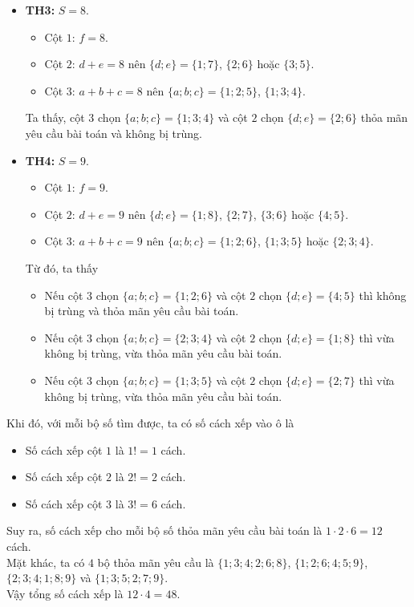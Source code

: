 \begin{ex}
{\begin{itemize}
			\begin{itemize}
				\item Cột $1$: $f=7$.
				\item Cột $2$: $d+e=7$ nên $\{d;e\}=\{1;6\}$, $\{2;5\}$ hoặc $\{3;4\}$.
				\item Cột $3$: $a+b+c=7$ nên $\{a;b;c\}=\{1;2;4\}$.
			\end{itemize}
			Vì cột $3$ và cột $2$ bị trùng các số $1$, $2$ và $4$ nên trường hợp này không xảy ra.
			\item \textbf{TH3:} $S=8$.
			\begin{itemize}
				\item Cột $1$: $f=8$.
				\item Cột $2$: $d+e=8$ nên $\{d;e\}=\{1;7\}$, $\{2;6\}$ hoặc $\{3;5\}$.
				\item Cột $3$: $a+b+c=8$ nên $\{a;b;c\}=\{1;2;5\}$, $\{1;3;4\}$.
			\end{itemize}
			Ta thấy, cột $3$ chọn $\{a;b;c\}=\{1;3;4\}$ và cột $2$ chọn $\{d;e\}=\{2;6\}$ thỏa mãn yêu cầu bài toán và không bị trùng.
			\item \textbf{TH4:} $S=9$.
			\begin{itemize}
				\item Cột $1$: $f=9$.
				\item Cột $2$: $d+e=9$ nên $\{d;e\}=\{1;8\}$, $\{2;7\}$, $\{3;6\}$ hoặc $\{4;5\}$.
				\item Cột $3$: $a+b+c=9$ nên $\{a;b;c\}=\{1;2;6\}$, $\{1;3;5\}$ hoặc $\{2;3;4\}$.
			\end{itemize}
			Từ đó, ta thấy
			\begin{itemize}
				\item Nếu cột $3$ chọn $\{a;b;c\}=\{1;2;6\}$ và cột $2$ chọn $\{d;e\}=\{4;5\}$ thì không bị trùng và thỏa mãn yêu cầu bài toán.
				\item Nếu cột $3$ chọn $\{a;b;c\}=\{2;3;4\}$ và cột $2$ chọn $\{d;e\}=\{1;8\}$ thì vừa không bị trùng, vừa thỏa mãn yêu cầu bài toán.
				\item Nếu cột $3$ chọn $\{a;b;c\}=\{1;3;5\}$ và cột $2$ chọn $\{d;e\}=\{2;7\}$ thì vừa không bị trùng, vừa thỏa mãn yêu cầu bài toán.
			\end{itemize}
		\end{itemize}
		Khi đó, với mỗi bộ số tìm được, ta có số cách xếp vào ô là
		\begin{itemize}
			\item Số cách xếp cột $1$ là $1!=1$ cách.
			\item Số cách xếp cột $2$ là $2!=2$ cách.
			\item Số cách xếp cột $3$ là $3!=6$ cách.
		\end{itemize}
		Suy ra, số cách xếp cho mỗi bộ số thỏa mãn yêu cầu bài toán là $1\cdot2\cdot6=12$ cách.\\
		Mặt khác, ta có $4$ bộ thỏa mãn yêu cầu là $\{1;3;4;2;6;8\}$, $\{1;2;6;4;5;9\}$, $\{2;3;4;1;8;9\}$ và $\{1;3;5;2;7;9\}$.\\
		Vậy tổng số cách xếp là $12\cdot4=48$.
	}
\end{ex}
